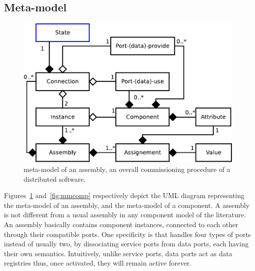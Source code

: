 \subsection{Meta-model}


\begin{figure}[tbp]
  \begin{center}
    \includegraphics[width=0.9\linewidth]{./images/ass_uml.pdf}
  \end{center}
  \caption{\mad meta-model of an assembly, \ie an overall
    commissioning procedure of a distributed software.}
  \label{fig:mmass}
\end{figure}

Figures~\ref{fig:mmass} and~\ref{fig:mmcomp} respectively depict the
UML diagram representing the \mad meta-model of an assembly, and the
meta-model of a component. A \mad assembly is not different from a
usual assembly in any component model of the literature. An assembly
basically contains component instances, connected to each other
through their compatible ports. One specificity is that \mad handles
four types of ports instead of usually two, by dissociating service
ports from data ports, each having their own semantics. Intuitively,
unlike service ports, data ports act as data registries thus, once
activated, they will remain active forever.

